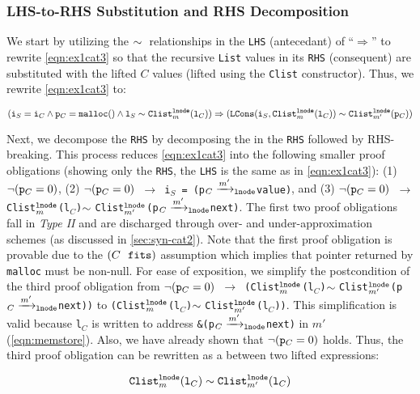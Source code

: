 \subsubsection{LHS-to-RHS Substitution and RHS Decomposition}
We start by utilizing
the $\sim{}$ relationships in the {\tt LHS} (antecedant) of ``$\Rightarrow$''
to rewrite \cref{eqn:ex1cat3}
so that the recursive {\tt List} values in its {\tt RHS} (consequent)
are substituted with the lifted $C$ values (lifted using
the {\tt Clist} constructor). Thus, we
rewrite \cref{eqn:ex1cat3} to:
\vspace{-5px}
\begin{small}
\begin{equation}\label{eqn:ex2cat3}
({\tt i}_S={\tt i}_C \land {\tt p}_C={\tt malloc()} \land {\tt l}_S \sim{} {\tt Clist}_m^{{\tt lnode}}({\tt l}_C)) \Rightarrow ({\tt LCons}({\tt i}_S, {\tt Clist}_m^{{\tt lnode}}({\tt l}_C)) \sim{} {\tt Clist}_{m'}^{{\tt lnode}}({\tt p}_C))
\end{equation}
\end{small}
Next, we decompose the {\tt RHS} by decomposing the \recursiveRelation{} in the {\tt RHS}
followed by RHS-breaking. This process reduces \cref{eqn:ex1cat3} into the following
smaller proof obligations (showing only the
{\tt RHS}, the {\tt LHS} is the same as in \cref{eqn:ex1cat3}):
(1) $\neg({\tt p}_C=0)$,
(2) {\tt $\neg({\tt p}_C=0)$ $\rightarrow$ i$_S$\ =\ (p$_C\xrightarrow[]{m'}_{\mathrm{\tt lnode}}$value)}, and
(3) {\tt $\neg({\tt p}_C=0)$ $\rightarrow$ Clist$_{m}^{{\tt lnode}}$(l$_C$)$\sim{}$Clist$_{m'}^{{\tt lnode}}$(p$_C\xrightarrow[]{m'}_{\mathrm{\tt lnode}}$next)}.
The first two proof obligations fall in {\em Type II} and
are discharged through over- and under-approximation schemes (as discussed
in \cref{sec:syn-cat2}). Note that the first proof obligation is provable due
to the $(C\ \  \mathrm{\tt fits})$ assumption which implies
that pointer returned by {\tt malloc} must be non-null.
For ease of exposition, we simplify the postcondition of the third proof obligation
from
{\small \tt $\neg({\tt p}_C=0)$ $\rightarrow$ (Clist$_{m}^{{\tt lnode}}$(l$_C$)$\sim{}$Clist$_{m'}^{{\tt lnode}}$(p$_C\xrightarrow[]{m'}_{\mathrm{\tt lnode}}$next))}
to
{\tt (Clist$_{m}^{{\tt lnode}}$(l$_C$)$\sim{}$Clist$_{m'}^{{\tt lnode}}$(l$_C$))}.
This simplification is valid because {\tt l$_C$}
is written
to address {\tt \&(p$_C\xrightarrow[]{m'}_{\mathrm{\tt lnode}}$next)}
in $m'$ (\cref{eqn:memstore}).
Also, we have already
shown that $\neg({\tt p}_C=0)$ holds.
Thus, the third proof obligation can be rewritten as
a \recursiveRelation{} between two lifted expressions:
\begin{small}
\begin{equation}\label{eqn:clistPreserved}
{\tt Clist}_m^{\tt lnode}({\tt l}_C) \sim{} {\tt Clist}_{m'}^{\tt lnode}({{\tt l}_C})
\end{equation}
\end{small}


